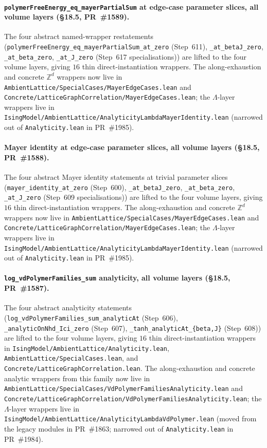 \documentclass[a4paper,11pt]{article}
\begin{document}
\paragraph{\texttt{polymerFreeEnergy\_eq\_mayerPartialSum} at
edge-case parameter slices, all volume layers (\S18.5, PR~\#1589).}
The four abstract named-wrapper restatements
(\texttt{polymerFreeEnergy\_eq\_mayerPartialSum\_at\_zero}
(Step~611), \texttt{\_at\_betaJ\_zero},
\texttt{\_at\_beta\_zero}, \texttt{\_at\_J\_zero}
(Step~617 specialisations)) are lifted to the four volume layers,
giving $16$ thin direct-instantiation wrappers. The
along-exhaustion and concrete $\mathbb{Z}^d$ wrappers now live in
\texttt{AmbientLattice/SpecialCases/MayerEdgeCases.lean}
and
\texttt{Concrete/LatticeGraphCorrelation/MayerEdgeCases.lean};
the $\Lambda$-layer wrappers live in
\texttt{IsingModel/AmbientLattice/AnalyticityLambdaMayerIdentity.lean}
(narrowed out of \texttt{Analyticity.lean} in PR~\#1985).

\paragraph{Mayer identity at edge-case parameter slices, all
volume layers (\S18.5, PR~\#1588).} The four abstract Mayer identity
statements at trivial parameter slices
(\texttt{mayer\_identity\_at\_zero} (Step~600),
\texttt{\_at\_betaJ\_zero}, \texttt{\_at\_beta\_zero},
\texttt{\_at\_J\_zero} (Step~609 specialisations)) are lifted to
the four volume layers, giving $16$ thin direct-instantiation
wrappers. The along-exhaustion and concrete $\mathbb{Z}^d$
wrappers now live in
\texttt{AmbientLattice/SpecialCases/MayerEdgeCases.lean}
and
\texttt{Concrete/LatticeGraphCorrelation/MayerEdgeCases.lean};
the $\Lambda$-layer wrappers live in
\texttt{IsingModel/AmbientLattice/AnalyticityLambdaMayerIdentity.lean}
(narrowed out of \texttt{Analyticity.lean} in PR~\#1985).

\paragraph{\texttt{log\_vdPolymerFamilies\_sum} analyticity, all
volume layers (\S18.5, PR~\#1587).} The four abstract analyticity
statements
(\texttt{log\_vdPolymerFamilies\_sum\_analyticAt} (Step~606),
\texttt{\_analyticOnNhd\_Ici\_zero} (Step~607),
\texttt{\_tanh\_analyticAt\_\{beta,J\}} (Step~608)) are lifted to
the four volume layers, giving $16$ thin direct-instantiation
wrappers in
\texttt{IsingModel/AmbientLattice/Analyticity.lean},
\texttt{AmbientLattice/SpecialCases.lean}, and
\texttt{Concrete/LatticeGraphCorrelation.lean}. The along-exhaustion
and concrete analytic wrappers from this family now live in
\texttt{AmbientLattice/SpecialCases/VdPolymerFamiliesAnalyticity.lean}
and
\texttt{Concrete/LatticeGraphCorrelation/VdPolymerFamiliesAnalyticity.lean};
the $\Lambda$-layer wrappers live in
\texttt{IsingModel/AmbientLattice/AnalyticityLambdaVdPolymer.lean}
(moved from the legacy modules in PR~\#1863; narrowed out of
\texttt{Analyticity.lean} in PR~\#1984).
\end{document}

